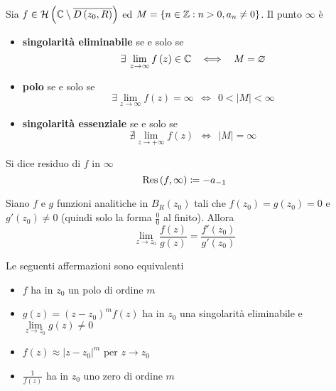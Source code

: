 \begin{thm}
Sia $f\in \mathcal{H} \left(\mathbb{C}  \setminus \overline{D\left(z_{0}, R\right)}\right)$ ed $M = \left\{n\in \mathbb{Z}  :n > 0, a_{n} \neq 0\right\}$. Il punto $\infty $ è

\begin{itemize}
\item \textbf{singolarità eliminabile} se e solo se
\begin{equation*}
\exists \lim\limits_{z\rightarrow \infty} f\left(z\right) \in \CC  \ \ \iff \ \ M = \emptyset 
\end{equation*}
\item \textbf{polo} se e solo se
\begin{equation*}
\exists \lim\limits_{z\rightarrow \infty} f\left(z\right) = \infty \ \ \iff \ \ 0 < \left| M\right| < \infty 
\end{equation*}
\item \textbf{singolarità essenziale} se e solo se
\begin{equation*}
\nexists \lim\limits_{z\rightarrow + \infty} f\left(z\right) \ \ \iff \ \ \left| M\right| = \infty 
\end{equation*}
\end{itemize}
\end{thm}
\begin{defn}
Si dice residuo di $f$ in $\infty $
\begin{equation*}
\operatorname{Res} \left(f, \infty \right) \coloneqq - a_{- 1}
\end{equation*}
\end{defn}
\begin{thm}
[di De l'Hôpital] Siano $f$ e $g$ funzioni analitiche in $B_{R}\left(z_{0}\right)$ tali che $f\left(z_{0}\right) = g\left(z_{0}\right) = 0$ e $g'\left(z_{0}\right) \neq 0$ (quindi solo la forma $\frac{0}{0}$ al finito). Allora
\begin{equation*}
\lim\limits_{z\rightarrow z_{0}}\frac{f\left(z\right)}{g\left(z\right)} = \frac{f'\left(z_{0}\right)}{g'\left(z_{0}\right)}
\end{equation*}
\end{thm}
\begin{thm}
Le seguenti affermazioni sono equivalenti
\begin{itemize}
\item $f$ ha in $z_{0}$ un polo di ordine $m$
\item $g\left(z\right) = \left(z - z_{0}\right)^{m} f\left(z\right)$ ha in $z_{0}$ una singolarità eliminabile e $\lim\limits_{z\rightarrow z_{0}} g\left(z\right) \neq 0$
\item $f\left(z\right) \approx \left| z - z_{0}\right|^{m}$ per $z\rightarrow z_{0}$
\item $\frac{1}{f\left(z\right)}$ ha in $z_{0}$ uno zero di ordine $m$
\end{itemize}
\end{thm}
